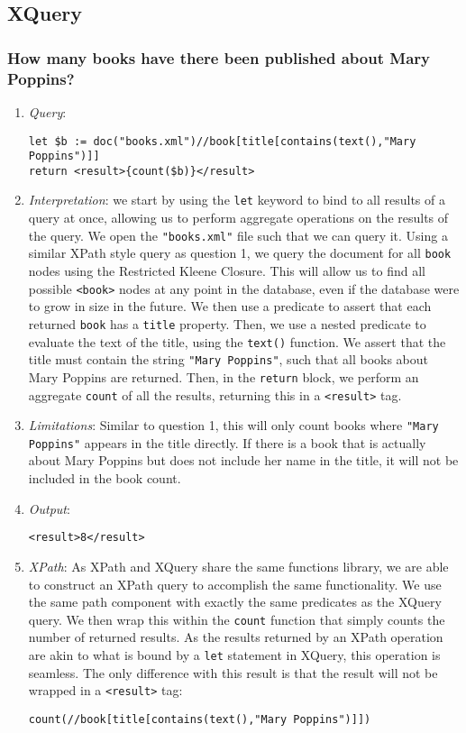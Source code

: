 \documentclass[11pt]{article}
\begin{document}
\subsection{XQuery}

\subsubsection{How many books have there been published about Mary Poppins?}

\begin{enumerate}
\item \textit{Query}:
\begin{small}
\begin{verbatim}
let $b := doc("books.xml")//book[title[contains(text(),"Mary Poppins")]]
return <result>{count($b)}</result>
\end{verbatim}
\end{small}
\item \textit{Interpretation}: we start by using the \texttt{let} keyword to bind to all results of a query at once, allowing us to perform aggregate operations on the results of the query. We open the \texttt{"books.xml"} file such that we can query it. Using a similar XPath style query as question 1, we query the document for all \texttt{book} nodes using the Restricted Kleene Closure. This will allow us to find all possible \texttt{<book>} nodes at any point in the database, even if the database were to grow in size in the future. We then use a predicate to assert that each returned \texttt{book} has a \texttt{title} property. Then, we use a nested predicate to evaluate the text of the title, using the \texttt{text()} function. We assert that the title must contain the string \texttt{"Mary Poppins"}, such that all books about Mary Poppins are returned. Then, in the \texttt{return} block, we perform an aggregate \texttt{count} of all the results, returning this in a \texttt{<result>} tag.
\item \textit{Limitations}: Similar to question 1, this will only count books where \texttt{"Mary Poppins"} appears in the title directly. If there is a book that is actually about Mary Poppins but does not include her name in the title, it will not be included in the book count.
\item \textit{Output}:
\begin{verbatim}
<result>8</result>
\end{verbatim} 
\item \textit{XPath}: As XPath and XQuery share the same functions library, we are able to construct an XPath query to accomplish the same functionality. We use the same path component with exactly the same predicates as the XQuery query. We then wrap this within the \texttt{count} function that simply counts the number of returned results. As the results returned by an XPath operation are akin to what is bound by a \texttt{let} statement in XQuery, this operation is seamless. The only difference with this result is that the result will not be wrapped in a \texttt{<result>} tag:
\begin{verbatim}
count(//book[title[contains(text(),"Mary Poppins")]])
\end{verbatim}
\end{enumerate}
\end{document}
